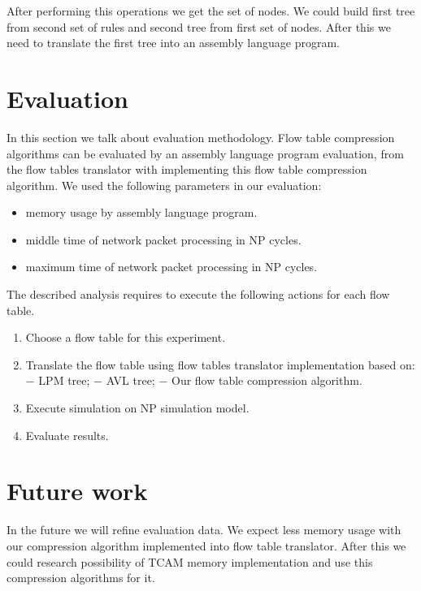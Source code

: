 \documentclass[conference]{IEEEtran}
\begin{document}
            After performing this operations we get the set of nodes. We could build first tree
            from second set of rules and second tree from first set of nodes. After this  we need to translate the
            first tree into an assembly language program.
    \section{Evaluation}
        In this section we talk about evaluation methodology. Flow table compression algorithms can be evaluated by an 
        assembly language program evaluation, from the flow tables translator with implementing
        this flow table compression algorithm.
        We used the following parameters in our evaluation:
        \begin{itemize}
            \item memory usage by assembly language program.
            \item middle time of network packet processing in NP cycles.
            \item maximum time of network packet processing in NP cycles.
        \end{itemize}
        
        The described analysis requires to execute the following actions for each flow table.

        \begin{enumerate}
            \item Choose a flow table for this experiment.
            \item Translate the flow table using flow tables translator implementation based on:
                \subitem $-$ LPM tree;
                \subitem $-$ AVL tree;
                \subitem $-$ Our flow table compression algorithm.
            \item Execute simulation on NP simulation model.
            \item Evaluate results.
        \end{enumerate}

    \section{Future work}
        In the future we will refine evaluation data. We expect less memory usage with our compression algorithm implemented
        into flow table translator. After this we could research possibility of TCAM memory implementation and use this 
        compression algorithms for it.
 \printbibliography{}
\end{document}
